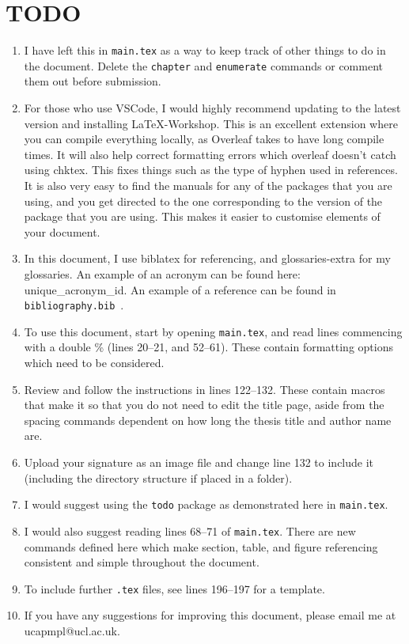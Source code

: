 \documentclass[a4paper, 12pt, twoside]{report}                                          %
\numberwithin{equation}{section}
\begin{document}
  

\chapter*{TODO}
\begin{enumerate}
  \item I have left this in \texttt{main.tex} as a way to keep track of other things to do in the document. Delete the \texttt{chapter} and \texttt{enumerate} commands or comment them out before submission.
  \item For those who use VSCode, I would highly recommend updating to the latest version and installing LaTeX-Workshop. This is an excellent extension where you can compile everything locally, as Overleaf takes to have long compile times. It will also help correct formatting errors which overleaf doesn't catch using chktex. This fixes things such as the type of hyphen used in references. It is also very easy to find the manuals for any of the packages that you are using, and you get directed to the one corresponding to the version of the package that you are using. This makes it easier to customise elements of your document.
  \item In this document, I use biblatex for referencing, and glossaries-extra for my glossaries. An example of an acronym can be found here: \gls{unique_acronym_id}. An example of a reference can be found in \newline \texttt{bibliography.bib}~\cite{latex-intro}.
  \item To use this document, start by opening \texttt{main.tex}, and read lines commencing with a double \% (lines 20--21, and 52--61). These contain formatting options which need to be considered.
  \item Review and follow the instructions in lines 122--132. These contain macros that make it so that you do not need to edit the title page, aside from the spacing commands dependent on how long the thesis title and author name are.
  \item Upload your signature as an image file and change line 132 to include it (including the directory structure if placed in a folder). 
  \item I would suggest using the \texttt{todo} package as demonstrated here  in \texttt{main.tex}.
  \item I would also suggest reading lines 68--71 of \texttt{main.tex}. There are new commands defined here which make section, table, and figure referencing consistent and simple throughout the document.
  \item To include further \texttt{.tex} files, see lines 196--197 for a template.
  \item If you have any suggestions for improving this document, please email me at ucapmpl@ucl.ac.uk. 
\end{enumerate}
\end{document}
